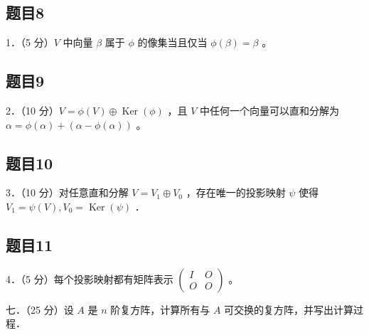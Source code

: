 \documentclass{article}
\begin{document}
\subsection{题目8}
1．（5 分）\(V\) 中向量 \(\beta\) 属于 \(\phi\) 的像集当且仅当 \(\phi(\beta)=\beta\) 。\\

\subsection{题目9}
2．（10 分）\(V=\phi(V) \oplus \operatorname{Ker}(\phi)\) ，且 \(V\) 中任何一个向量可以直和分解为 \(\alpha=\phi(\alpha)+(\alpha-\phi(\alpha))\) 。\\

\subsection{题目10}
3．（10 分）对任意直和分解 \(V=V_{1} \oplus V_{0}\) ，存在唯一的投影映射 \(\psi\) 使得 \(V_{1}=\psi(V), V_{0}=\operatorname{Ker}(\psi)\) ．\\

\subsection{题目11}
4．（5 分）每个投影映射都有矩阵表示 \(\left(\begin{array}{cc}I & O \\ O & O\end{array}\right)\) 。

七．（25 分）设 \(A\) 是 \(n\) 阶复方阵，计算所有与 \(A\) 可交换的复方阵，并写出计算过程．
\end{document}
